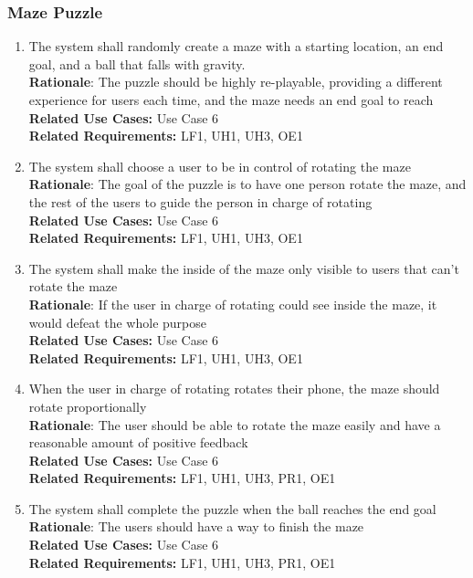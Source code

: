 \documentclass[12pt]{article}
\begin{document}
\subsubsection{Maze Puzzle}
\begin{enumerate}[label=MP\arabic*., series=MazePuzzle ]
        \item The system shall randomly create a maze with a starting location, an end goal, and a ball that falls with gravity. \\
        \textbf{Rationale}: The puzzle should be highly re-playable, providing a different experience for users each time, and the maze needs an end goal to reach\\
        \textbf{Related Use Cases:} Use Case 6\\
        \textbf{Related Requirements:} LF1, UH1, UH3, OE1
        \item The system shall choose a user to be in control of rotating the maze \\
        \textbf{Rationale}: The goal of the puzzle is to have one person rotate the maze, and the rest of the users to guide the person in charge of rotating\\
        \textbf{Related Use Cases:} Use Case 6\\
        \textbf{Related Requirements:} LF1, UH1, UH3, OE1
        \item The system shall make the inside of the maze only visible to users that can't rotate the maze \\
        \textbf{Rationale}: If the user in charge of rotating could see inside the maze, it would defeat the whole purpose\\
        \textbf{Related Use Cases:} Use Case 6\\
        \textbf{Related Requirements:} LF1, UH1, UH3, OE1
        \item When the user in charge of rotating rotates their phone, the maze should rotate proportionally \\
        \textbf{Rationale}: The user should be able to rotate the maze easily and have a reasonable amount of positive feedback\\
        \textbf{Related Use Cases:} Use Case 6\\
        \textbf{Related Requirements:} LF1, UH1, UH3, PR1, OE1
        \item The system shall complete the puzzle when the ball reaches the end goal\\
        \textbf{Rationale}: The users should have a way to finish the maze\\
        \textbf{Related Use Cases:} Use Case 6\\
        \textbf{Related Requirements:} LF1, UH1, UH3, PR1, OE1
\end{enumerate}
\end{document}
